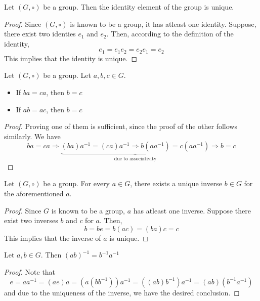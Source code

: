 \begin{proposition}
	Let $(G,\circ)$ be a group. Then the identity element of the group is unique.
\end{proposition}
\begin{proof}
	Since $(G,\circ)$ is known to be a group, it has atleast one identity. Suppose, there exist two identies $e_1$ and $e_2$. Then, according to the definition of the identity,
	$$
	e_1 = e_1e_2 = e_2e_1 = e_2
	$$
	This implies that the identity is unique.
\end{proof}
\begin{proposition}
	Let $(G,\circ)$ be a group. Let $a,b,c\in G$.
	\begin{itemize}
		\item If $ba=ca$, then $b=c$
		\item If $ab=ac$, then $b=c$
	\end{itemize}
\end{proposition}
\begin{proof}
	Proving one of them is sufficient, since the proof of the other follows similarly. We have 
	$$
	ba = ca \Longrightarrow  \underbrace{(ba)a^{-1} =(ca)a^{-1} \Longrightarrow b(aa^{-1})=c(aa^{-1})}_{\text{due to associativity}} \Longrightarrow b=c
	$$
\end{proof}
\begin{proposition}
	Let $(G,\circ)$ be a group. For every $a\in G$, there exists a unique inverse $b\in G$ for the aforementioned $a$.
\end{proposition}
\begin{proof}
	Since $G$ is known to be a group, $a$ has atleast one inverse. Suppose there exist two inverses $b$ and $c$ for $a$. Then, 
	$$
	b = be = b(ac) = (ba)c = c
	$$
	This implies that the inverse of $a$ is unique.
\end{proof}

\begin{proposition}
	Let $a,b\in G$. Then $(ab)^{-1}=b^{-1}a^{-1}$
\end{proposition}
\begin{proof}
	Note that 
	$$
	e = aa^{-1} = (ae)a = (a(bb^{-1}))a^{-1} = ((ab)b^{-1})a^{-1} = (ab)(b^{-1}a^{-1})
	$$
	and due to the uniqueness of the inverse, we have the desired conclusion.
\end{proof}







